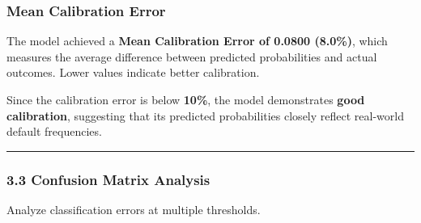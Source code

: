 \documentclass[11pt]{article}
\begin{document}
\subsubsection{Mean Calibration Error}\label{mean-calibration-error}

The model achieved a \textbf{Mean Calibration Error of 0.0800 (8.0\%)},
which measures the average difference between predicted probabilities
and actual outcomes. Lower values indicate better calibration.

Since the calibration error is below \textbf{10\%}, the model
demonstrates \textbf{good calibration}, suggesting that its predicted
probabilities closely reflect real-world default frequencies.

    \begin{center}\rule{0.5\linewidth}{0.5pt}\end{center}

\subsubsection{3.3 Confusion Matrix
Analysis}\label{confusion-matrix-analysis}

Analyze classification errors at multiple thresholds.
\end{document}
